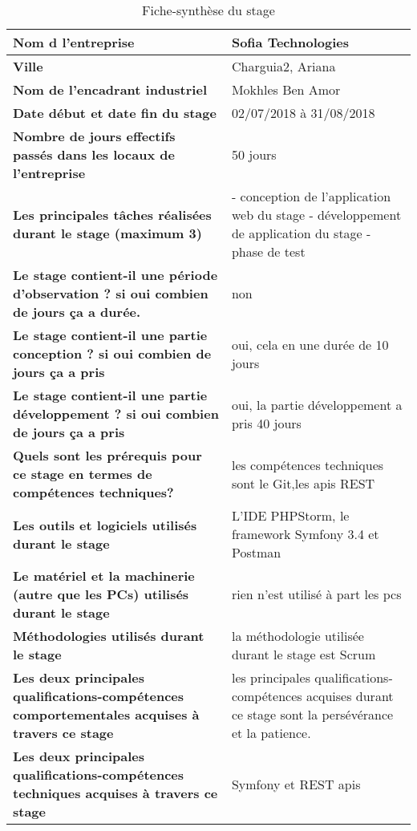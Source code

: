 \thispagestyle{empty}

\begin{center}
    \begin{table}[!ht]
    \center
   \begin{tabular}{| p{6cm} | p{8cm}|}
\hline
\textbf {Nom d l’entreprise }  & Sofia Technologies \\ \hline
\textbf{Ville } & Charguia2, Ariana \\ \hline
\textbf{Nom de l’encadrant industriel} & Mokhles Ben Amor\\ \hline
\textbf{Date début et date fin du stage} & 02/07/2018 à 31/08/2018\\ 
\hline
\textbf{Nombre de jours effectifs passés dans les locaux de l’entreprise} & 50 jours \\ 
\hline
\textbf{Les  principales tâches réalisées durant le stage (maximum 3)} & - conception de l'application web du stage
\newline
- développement de application du stage 
\newline
- phase de test\\
\hline
\textbf{Le stage contient-il une période d’observation ?  si oui combien de jours ça a durée.} & non\\ 
\hline
\textbf{Le stage contient-il une partie conception ?  si oui combien de jours ça a pris} & oui, cela en une durée de 10 jours \\
\hline
\textbf{Le stage contient-il une partie développement ? si oui combien de jours ça a pris} & oui, la partie développement a pris 40 jours\\
\hline
\textbf{Quels sont les prérequis pour ce stage en termes de compétences techniques?} & les compétences techniques sont le Git,les apis REST   \\
\hline
\textbf{Les outils et logiciels  utilisés durant le stage} & L'IDE PHPStorm, le framework Symfony 3.4 et Postman\\
\hline
\textbf{Le matériel et la machinerie (autre que les PCs) utilisés durant le stage} & rien n'est utilisé à part les pcs \\
\hline
\textbf{Méthodologies  utilisés durant le stage} & la méthodologie utilisée durant le stage est Scrum \\
\hline
\textbf{Les deux  principales qualifications-compétences comportementales acquises à travers ce stage} & les  principales qualifications-compétences acquises durant ce stage sont la persévérance et la patience.\\
\hline
\textbf{Les deux  principales qualifications-compétences techniques  acquises à travers ce stage} & Symfony et REST apis\\
\hline
\end{tabular}
    \caption{Fiche-synthèse du stage}\label{tdescp}
\end{table}
    

\end{center}
